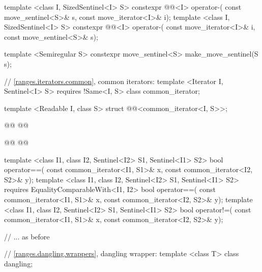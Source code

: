 \begin{codeblock}
{{    template <class I, SizedSentinel<I> S>
      constexpr @@<I> operator-(
        const move_sentinel<S>& s, const move_iterator<I>& i);
    template <class I, SizedSentinel<I> S>
      constexpr @@<I> operator-(
        const move_iterator<I>& i, const move_sentinel<S>& s);

    template <Semiregular S>
      constexpr move_sentinel<S> make_move_sentinel(S s);

    // \ref{ranges.iterators.common}, common iterators:
    template <Iterator I, Sentinel<I> S>
      requires !Same<I, S>
    class common_iterator;

    template <Readable I, class S>
    struct @@<common_iterator<I, S>>;

    @@
    @@

    @@
    @@

    template <class I1, class I2, Sentinel<I2> S1, Sentinel<I1> S2>
    bool operator==(
      const common_iterator<I1, S1>& x, const common_iterator<I2, S2>& y);
    template <class I1, class I2, Sentinel<I2> S1, Sentinel<I1> S2>
      requires EqualityComparableWith<I1, I2>
    bool operator==(
      const common_iterator<I1, S1>& x, const common_iterator<I2, S2>& y);
    template <class I1, class I2, Sentinel<I2> S1, Sentinel<I1> S2>
    bool operator!=(
      const common_iterator<I1, S1>& x, const common_iterator<I2, S2>& y);

    // ... as before

    // \ref{ranges.dangling.wrappers}, dangling wrapper:
    template <class T> class dangling;

}}
\end{codeblock}
